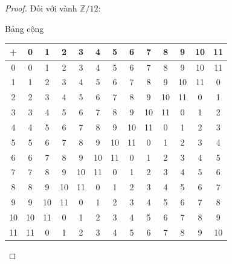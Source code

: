 \begin{proof}Đối với vành $\mathbb{Z}/12$:

    \par Bảng cộng
    \\
    \begin{tabular}{c|cccccccccccc}
        +  & 0  & 1  & 2  & 3  & 4  & 5  & 6  & 7  & 8  & 9  & 10 & 11 \\
        \hline
        0  & 0  & 1  & 2  & 3  & 4  & 5  & 6  & 7  & 8  & 9  & 10 & 11 \\
        1  & 1  & 2  & 3  & 4  & 5  & 6  & 7  & 8  & 9  & 10 & 11 & 0  \\
        2  & 2  & 3  & 4  & 5  & 6  & 7  & 8  & 9  & 10 & 11 & 0  & 1  \\
        3  & 3  & 4  & 5  & 6  & 7  & 8  & 9  & 10 & 11 & 0  & 1  & 2  \\
        4  & 4  & 5  & 6  & 7  & 8  & 9  & 10 & 11 & 0  & 1  & 2  & 3  \\
        5  & 5  & 6  & 7  & 8  & 9  & 10 & 11 & 0  & 1  & 2  & 3  & 4  \\
        6  & 6  & 7  & 8  & 9  & 10 & 11 & 0  & 1  & 2  & 3  & 4  & 5  \\
        7  & 7  & 8  & 9  & 10 & 11 & 0  & 1  & 2  & 3  & 4  & 5  & 6  \\
        8  & 8  & 9  & 10 & 11 & 0  & 1  & 2  & 3  & 4  & 5  & 6  & 7  \\
        9  & 9  & 10 & 11 & 0  & 1  & 2  & 3  & 4  & 5  & 6  & 7  & 8  \\
        10 & 10 & 11 & 0  & 1  & 2  & 3  & 4  & 5  & 6  & 7  & 8  & 9  \\
        11 & 11 & 0  & 1  & 2  & 3  & 4  & 5  & 6  & 7  & 8  & 9  & 10
    \end{tabular}

    \bigskip


\end{proof}
